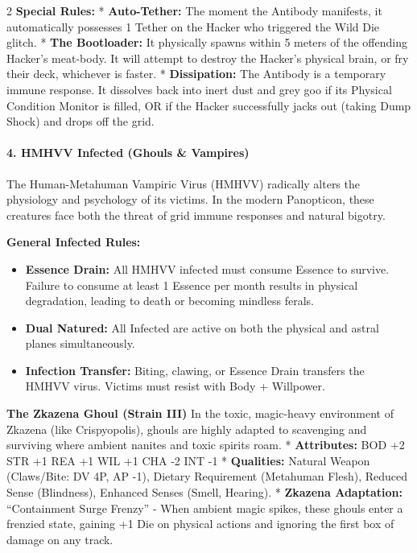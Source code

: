 \documentclass[
  oneside]{article}
\providecommand{\tightlist}{%
  \setlength{\itemsep}{0pt}\setlength{\parskip}{0pt}}
\begin{document}
\begin{multicols}{2}
\textbf{Special Rules:} * \textbf{Auto-Tether:}
The moment the Antibody manifests, it
automatically possesses 1 Tether on the Hacker who
triggered the Wild Die glitch. * \textbf{The
Bootloader:} It physically spawns within 5 meters
of the offending Hacker's meat-body. It will
attempt to destroy the Hacker's physical brain, or
fry their deck, whichever is faster. *
\textbf{Dissipation:} The Antibody is a temporary
immune response. It dissolves back into inert dust
and grey goo if its Physical Condition Monitor is
filled, OR if the Hacker successfully jacks out
(taking Dump Shock) and drops off the grid.

\hypertarget{hmhvv-infected-ghouls-vampires}{%
\paragraph{4. HMHVV Infected (Ghouls \&
Vampires)}\label{hmhvv-infected-ghouls-vampires}}

The Human-Metahuman Vampiric Virus (HMHVV)
radically alters the physiology and psychology of
its victims. In the modern Panopticon, these
creatures face both the threat of grid immune
responses and natural bigotry.

\textbf{General Infected Rules:}

\begin{itemize}
\tightlist
\item
  \textbf{Essence Drain:} All HMHVV infected must
  consume Essence to survive. Failure to consume
  at least 1 Essence per month results in physical
  degradation, leading to death or becoming
  mindless ferals.
\item
  \textbf{Dual Natured:} All Infected are active
  on both the physical and astral planes
  simultaneously.
\item
  \textbf{Infection Transfer:} Biting, clawing, or
  Essence Drain transfers the HMHVV virus. Victims
  must resist with Body + Willpower.
\end{itemize}

\textbf{The Zkazena Ghoul (Strain III)} In the
toxic, magic-heavy environment of Zkazena (like
Crispyopolis), ghouls are highly adapted to
scavenging and surviving where ambient nanites and
toxic spirits roam. * \textbf{Attributes:} BOD +2
\textbar{} STR +1 \textbar{} REA +1 \textbar{} WIL
+1 \textbar{} CHA -2 \textbar{} INT -1 *
\textbf{Qualities:} Natural Weapon (Claws/Bite: DV
4P, AP -1), Dietary Requirement (Metahuman Flesh),
Reduced Sense (Blindness), Enhanced Senses (Smell,
Hearing). * \textbf{Zkazena Adaptation:}
``Containment Surge Frenzy'' - When ambient magic
spikes, these ghouls enter a frenzied state,
gaining +1 Die on physical actions and ignoring
the first box of damage on any track.


\end{multicols}
\end{document}
